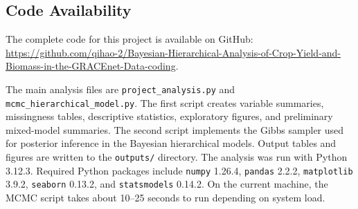 \documentclass[11pt]{article}
\begin{document}
\subsection*{Code Availability}
The complete code for this project is available on GitHub: 
\url{https://github.com/qihao-2/Bayesian-Hierarchical-Analysis-of-Crop-Yield-and-Biomass-in-the-GRACEnet-Data-coding}.

The main analysis files are \texttt{project\_analysis.py} and \texttt{mcmc\_\allowbreak hierarchical\_\allowbreak model.py}. The first script creates variable summaries, missingness tables, descriptive statistics, exploratory figures, and preliminary mixed-model summaries. The second script implements the Gibbs sampler used for posterior inference in the Bayesian hierarchical models. Output tables and figures are written to the \texttt{outputs/} directory. The analysis was run with Python 3.12.3. Required Python packages include \texttt{numpy} 1.26.4, \texttt{pandas} 2.2.2, \texttt{matplotlib} 3.9.2, \texttt{seaborn} 0.13.2, and \texttt{statsmodels} 0.14.2. On the current machine, the MCMC script takes about 10--25 seconds to run depending on system load.
\end{document}
